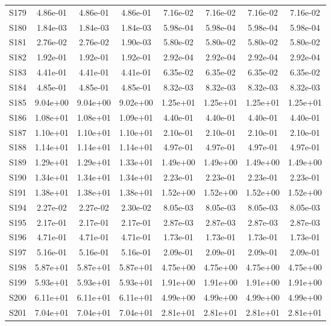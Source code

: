 {\begin{longtable}{l S[table-format=1.2e+2] S[table-format=1.2e+2] S[table-format=1.2e+2] S[table-format=1.2e+2] S[table-format=1.2e+2] S[table-format=1.2e+2] S[table-format=1.2e+2]}
S179 & 4.86e-01 & 4.86e-01 & 4.86e-01 & 7.16e-02 & 7.16e-02 & 7.16e-02 & 7.16e-02 \\
S180 & 1.84e-03 & 1.84e-03 & 1.84e-03 & 5.98e-04 & 5.98e-04 & 5.98e-04 & 5.98e-04 \\
S181 & 2.76e-02 & 2.76e-02 & 1.90e-03 & 5.80e-02 & 5.80e-02 & 5.80e-02 & 5.80e-02 \\
S182 & 1.92e-01 & 1.92e-01 & 1.92e-01 & 2.92e-04 & 2.92e-04 & 2.92e-04 & 2.92e-04 \\
S183 & 4.41e-01 & 4.41e-01 & 4.41e-01 & 6.35e-02 & 6.35e-02 & 6.35e-02 & 6.35e-02 \\
S184 & 4.85e-01 & 4.85e-01 & 4.85e-01 & 8.32e-03 & 8.32e-03 & 8.32e-03 & 8.32e-03 \\
S185 & 9.04e+00 & 9.04e+00 & 9.02e+00 & 1.25e+01 & 1.25e+01 & 1.25e+01 & 1.25e+01 \\
S186 & 1.08e+01 & 1.08e+01 & 1.09e+01 & 4.40e-01 & 4.40e-01 & 4.40e-01 & 4.40e-01 \\
S187 & 1.10e+01 & 1.10e+01 & 1.10e+01 & 2.10e-01 & 2.10e-01 & 2.10e-01 & 2.10e-01 \\
S188 & 1.14e+01 & 1.14e+01 & 1.14e+01 & 4.97e-01 & 4.97e-01 & 4.97e-01 & 4.97e-01 \\
S189 & 1.29e+01 & 1.29e+01 & 1.33e+01 & 1.49e+00 & 1.49e+00 & 1.49e+00 & 1.49e+00 \\
S190 & 1.34e+01 & 1.34e+01 & 1.34e+01 & 2.23e-01 & 2.23e-01 & 2.23e-01 & 2.23e-01 \\
S191 & 1.38e+01 & 1.38e+01 & 1.38e+01 & 1.52e+00 & 1.52e+00 & 1.52e+00 & 1.52e+00 \\
S194 & 2.27e-02 & 2.27e-02 & 2.30e-02 & 8.05e-03 & 8.05e-03 & 8.05e-03 & 8.05e-03 \\
S195 & 2.17e-01 & 2.17e-01 & 2.17e-01 & 2.87e-03 & 2.87e-03 & 2.87e-03 & 2.87e-03 \\
S196 & 4.71e-01 & 4.71e-01 & 4.71e-01 & 1.73e-01 & 1.73e-01 & 1.73e-01 & 1.73e-01 \\
S197 & 5.16e-01 & 5.16e-01 & 5.16e-01 & 2.09e-01 & 2.09e-01 & 2.09e-01 & 2.09e-01 \\
S198 & 5.87e+01 & 5.87e+01 & 5.87e+01 & 4.75e+00 & 4.75e+00 & 4.75e+00 & 4.75e+00 \\
S199 & 5.93e+01 & 5.93e+01 & 5.93e+01 & 1.91e+00 & 1.91e+00 & 1.91e+00 & 1.91e+00 \\
S200 & 6.11e+01 & 6.11e+01 & 6.11e+01 & 4.99e+00 & 4.99e+00 & 4.99e+00 & 4.99e+00 \\
S201 & 7.04e+01 & 7.04e+01 & 7.04e+01 & 2.81e+01 & 2.81e+01 & 2.81e+01 & 2.81e+01 \\

\end{longtable}}
